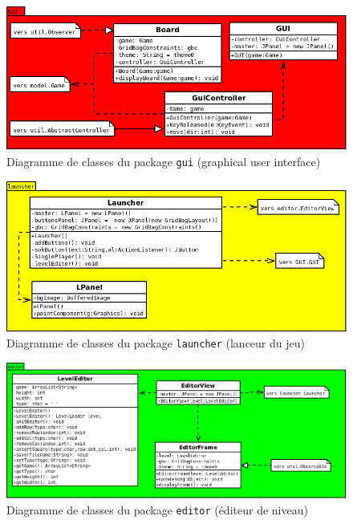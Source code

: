\documentclass[a4paper, 11pt]{report}
\begin{document}
\begin{figure}[h!]
\centering
\includegraphics[width=.8\textwidth]{uml/gui_uml.png}%
\caption{Diagramme de classes du package \texttt{gui} (graphical user interface)}
\label{uml:gui}
\end{figure}

\begin{figure}[h!]
\centering
\includegraphics[width=.8\textwidth]{uml/launcher_uml.png}%
\caption{Diagramme de classes du package \texttt{launcher} (lanceur du jeu)}
\label{uml:launcher}
\end{figure}

\begin{figure}[h!]
\centering
\includegraphics[width=.8\textwidth]{uml/levelEditor_uml.png}%
\caption{Diagramme de classes du package \texttt{editor} (éditeur de niveau)}
\label{uml:editor}
\end{figure}
\end{document}
